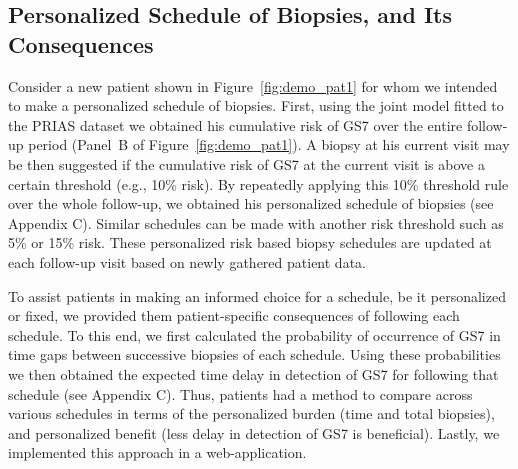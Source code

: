 \subsection{Personalized Schedule of Biopsies, and Its Consequences}
Consider a new patient shown in Figure~\ref{fig:demo_pat1} for whom we intended to make a personalized schedule of biopsies. First, using the joint model fitted to the PRIAS dataset we obtained his cumulative risk of GS7 over the entire follow-up period (Panel~B of Figure~\ref{fig:demo_pat1}). A biopsy at his current visit may be then suggested if the cumulative risk of GS7 at the current visit is above a certain threshold (e.g., 10\% risk). By repeatedly applying this 10\% threshold rule over the whole follow-up, we obtained his personalized schedule of biopsies (see Appendix C). Similar schedules can be made with another risk threshold such as 5\% or 15\% risk. These personalized risk based biopsy schedules are updated at each follow-up visit based on newly gathered patient data. 

To assist patients in making an informed choice for a schedule, be it personalized or fixed, we provided them patient-specific consequences of following each schedule. To this end, we first calculated the probability of occurrence of GS7 in time gaps between successive biopsies of each schedule. Using these probabilities we then obtained the expected time delay in detection of GS7 for following that schedule (see Appendix C). Thus, patients had a method to compare across various schedules in terms of the personalized burden (time and total biopsies), and personalized benefit (less delay in detection of GS7 is beneficial). Lastly, we implemented this approach in a web-application.

